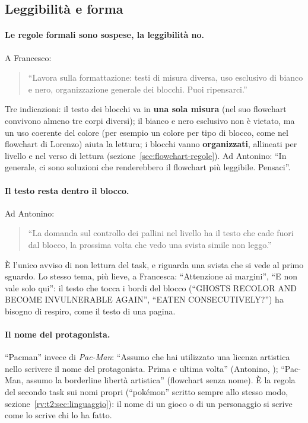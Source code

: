 \subsection{Leggibilità e forma}
\label{rv:t4:sec:forma}

\paragraph{Le regole formali sono sospese, la leggibilità no.} A Francesco:
\begin{quote}
  ``Lavora sulla formattazione: testi di misura diversa, uso esclusivo di
  bianco e nero, organizzazione generale dei blocchi. Puoi ripensarci.''
\end{quote}
Tre indicazioni: il testo dei blocchi va in \textbf{una sola misura} (nel suo
flowchart convivono almeno tre corpi diversi); il bianco e nero esclusivo non
è vietato, ma un uso coerente del colore (per esempio un colore per tipo di
blocco, come nel flowchart di Lorenzo) aiuta la lettura; i blocchi vanno
\textbf{organizzati}, allineati per livello e nel verso di lettura
(sezione~\ref{sec:flowchart-regole}). Ad Antonino: ``In generale, ci sono
soluzioni che renderebbero il flowchart più leggibile. Pensaci''.

\paragraph{Il testo resta dentro il blocco.} Ad Antonino:
\begin{quote}
  ``La domanda sul controllo dei pallini nel livello ha il testo che cade fuori
  dal blocco, la prossima volta che vedo una svista simile non leggo.''
  \rvAvviso
\end{quote}
È l'unico avviso di non lettura del task, e riguarda una svista che si vede
al primo sguardo. Lo stesso tema, più lieve, a Francesca: ``Attenzione ai
margini'', ``E non vale solo qui'': il testo che tocca i bordi del blocco
(``GHOSTS RECOLOR AND BECOME INVULNERABLE AGAIN'', ``EATEN CONSECUTIVELY?'')
ha bisogno di respiro, come il testo di una pagina.

\paragraph{Il nome del protagonista.} ``Pacman'' invece di \emph{Pac-Man}:
``Assumo che hai utilizzato una licenza artistica nello scrivere il nome del
protagonista. Prima e ultima volta'' (Antonino, \rvAvviso); ``Pac-Man, assumo
la borderline libertà artistica'' (flowchart senza nome). È la regola del
secondo task sui nomi propri (``pokémon'' scritto sempre allo stesso modo,
sezione~\ref{rv:t2:sec:linguaggio}): il nome di un gioco o di un personaggio
si scrive come lo scrive chi lo ha fatto.

